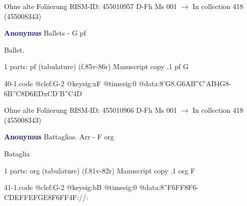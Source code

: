 \documentclass[twocolumn]{book}
\begin{document}
\newline Ohne alte Foliierung
\newline RISM-ID: 455010957
\newline D-Fh  Ms 001
\newline $\rightarrow$ In collection 418 (455008343)
      
\newline \par \vspace{7pt} \textcolor{darkblue}{\textbf{Anonymus  }}
\newline Ballets - G
\newline pf
\newline \begin{itshape}[f.85v, at left:] Ballet.\end{itshape} 
\newline \textcolor{darkblue}{}  1 parts: pf (tabulature)  (f.85v-86r)
\newline Manuscript copy
.1  pf  G  
\begin{filecontents*}{40-1.code}
@clef:G-2
@keysig:xF
@timesig:0
@data:8'G{8.G6A}{B''C'AB}4G8-{6B''C}{8D6ED}{xCD'B''C}4D
\end{filecontents*}
\newline
%

\newline Ohne alte Foliierung
\newline RISM-ID: 455010966
\newline D-Fh  Ms 001
\newline $\rightarrow$ In collection 418 (455008343)
      
\newline \par \vspace{7pt} \textcolor{darkblue}{\textbf{Anonymus  }}
\newline Battaglias. Arr - F
\newline org
\newline \begin{itshape}[f.81v, at left:] Bataglia\end{itshape} 
\newline \textcolor{darkblue}{}  1 parts: org (tabulature)  (f.81v-82r)
\newline Manuscript copy
.1  org  F  
\begin{filecontents*}{41-1.code}
@clef:G-2
@keysig:bB
@timesig:0
@data:{8''F6FF}8F6-C{DEFF}{EFGE}{8F6FF}4F://:
\end{filecontents*}
\newline
%
\end{document}
